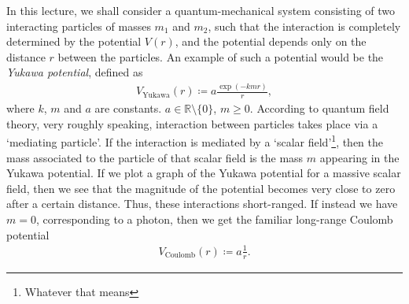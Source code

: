 \documentclass[12pt, a4 paper]{article}
\theoremstyle{definition}
\newcommand{\rr}{\mathbb{R}}
\begin{document}
	\begin{figure}
	    \centering
	\end{figure}
	In this lecture, we shall consider a quantum-mechanical system consisting of two interacting particles of masses \(m_1\) and \(m_2\), such that the interaction is completely determined by the potential $V(r)$, and the potential depends only on the distance $r$ between the particles. An example of such a potential would be the \textit{Yukawa potential}, defined as
	\begin{align*}
		V_{\text{Yukawa}}(r) \coloneq a \frac{\exp({-kmr})}{r},
	\end{align*}
	where $k$, $m$ and $a$ are constants. $a \in \rr \setminus \{0\}$, $m \geq 0$. According to quantum field theory, very roughly speaking, interaction between particles takes place via a `mediating particle'. If the interaction is mediated by a `scalar field'\footnote{Whatever that means}, then the mass associated to the particle of that scalar field is the mass $m$ appearing in the Yukawa potential. If we plot a graph of the Yukawa potential for a massive scalar field, then we see that the magnitude of the potential becomes very close to zero after a certain distance. Thus, these interactions short-ranged. If instead we have $m = 0$, corresponding to a photon, then we get the familiar long-range Coulomb potential
	\begin{align*}
		V_{\text{Coulomb}}(r) \coloneq a \frac{1}{r}.
	\end{align*}
\end{document}
